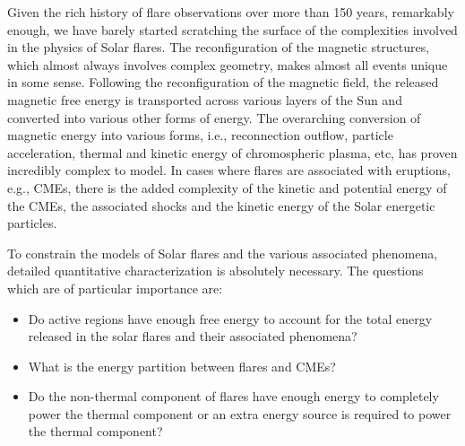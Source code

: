 Given the rich history of flare observations over more than 150 years, remarkably enough, we have barely started scratching the surface of the complexities involved in the physics of Solar flares. The reconfiguration of the magnetic structures, which almost always involves complex geometry, makes almost all events unique in some sense. Following the reconfiguration of the magnetic field, the released magnetic free energy is transported across various layers of the Sun and converted into various other forms of energy. The overarching conversion of magnetic energy into various forms, i.e., reconnection outflow, particle acceleration, thermal and kinetic energy of chromospheric plasma, etc, has proven incredibly complex to model. In cases where flares are associated with eruptions, e.g., CMEs, there is the added complexity of the kinetic and potential energy of the CMEs, the associated shocks and the kinetic energy of the Solar energetic particles.

To constrain the models of Solar flares and the various associated phenomena, detailed quantitative characterization is absolutely necessary. %
The questions which are of particular importance are:

\begin{itemize}
    \item Do active regions have enough free energy to account for the total energy released in the solar flares and their associated phenomena?
    \item What is the energy partition between flares and CMEs?
    \item Do the non-thermal component of flares have enough energy to completely power the thermal component or an extra energy source is required to power the thermal component?
\end{itemize}



